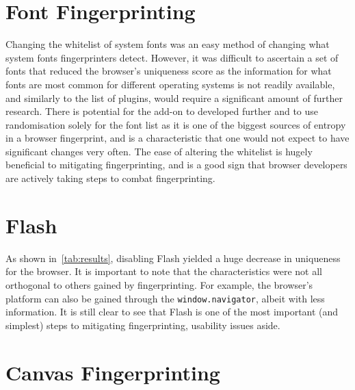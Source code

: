 \section{Font Fingerprinting}

Changing the whitelist of system fonts was an easy method of changing what system fonts fingerprinters detect.
However, it was difficult to ascertain a set of fonts that reduced the browser's uniqueness score as the information for what fonts are most common for different operating systems is not readily available, and similarly to the list of plugins, would require a significant amount of further research.
There is potential for the add-on to developed further and to use randomisation solely for the font list as it is one of the biggest sources of entropy in a browser fingerprint, and is a characteristic that one would not expect to have significant changes very often.
The ease of altering the whitelist is hugely beneficial to mitigating fingerprinting, and is a good sign that browser developers are actively taking steps to combat fingerprinting.

\section{Flash}

As shown in~\ref{tab:results}, disabling Flash yielded a huge decrease in uniqueness for the browser.
It is important to note that the characteristics were not all orthogonal to others gained by fingerprinting.
For example, the browser's platform can also be gained through the \texttt{window.navigator}, albeit with less information.
It is still clear to see that Flash is one of the most important (and simplest) steps to mitigating fingerprinting, usability issues aside.

\section{Canvas Fingerprinting}

